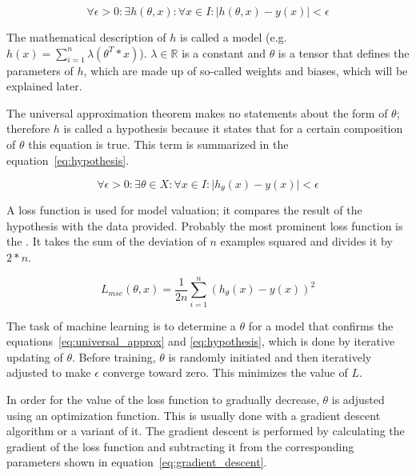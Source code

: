 \begin{equation}
    \forall \epsilon > 0 :
    \exists h(\theta, x) : \forall x \in I : | h(\theta, x) - y(x) | < \epsilon
    \label{eq:universal_approx}
\end{equation}

The mathematical description of $h$ is called a model (e.g. $h(x) = \sum_{i=1}^n{\lambda (\theta^T * x)}$).
$\lambda \in \mathbb{R}$ is a constant and $\theta$ is a tensor that defines the parameters of $h$, which are made up of so-called weights and biases, which will be explained later.

The universal approximation theorem makes no statements about the form of $\theta$; therefore $h$ is called a hypothesis because it states that for a certain composition of $\theta$ this equation is true.
This term is summarized in the equation~\eqref{eq:hypothesis}.

\begin{equation}
    \forall \epsilon > 0 : \exists \theta \in X : \forall x \in I : |
    h_\theta(x) - y(x) | < \epsilon
    \label{eq:hypothesis}
\end{equation}

A loss function is used for model valuation; it compares the result of the hypothesis with the data provided.
Probably the most prominent loss function is the .
It takes the sum of the deviation of $n$ examples squared and divides it by $2*n$.

\begin{equation}
    L_{mse}(\theta, x) = \frac{1}{2 n} \sum_{i=1}^n (h_\theta(x) - y(x))^2
    \label{eq:mse}
\end{equation} 

The task of machine learning is to determine a $\theta$ for a model that confirms the equations~\ref{eq:universal_approx} and \ref{eq:hypothesis}, which is done by iterative updating of $\theta$. 
Before training, $\theta$ is randomly initiated and then iteratively adjusted to make $\epsilon$ converge toward zero. This minimizes the value of $L$.

In order for the value of the loss function to gradually decrease, $\theta$ is adjusted using an optimization function.
This is usually done with a gradient descent algorithm or a variant of it.
The gradient descent is performed by calculating the gradient of the loss function and subtracting it from the corresponding parameters shown in equation~\eqref{eq:gradient_descent}.

